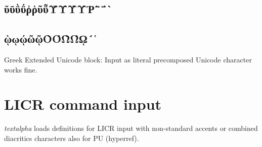 \documentclass{article}
\begin{document}
\subsection{ῠῡῢΰῤῥῦῧῨῩῪΎῬ῭΅`}
\subsection{ῲῳῴῶῷῸΌῺΏῼ´῾}

Greek Extended Unicode block: Input as literal precomposed Unicode character
works fine.

\section{LICR command input}

\newcommand*{\GreekAndCopticI}{\greekscript
  \textdexiakeraia
  \textaristerikeraia
  { }\ypogegrammeni
  \texterotimatiko
  \acctonos{ }
  \"'{ }
  \'\textAlpha
  \textanoteleia
  \'\textEpsilon
  \'\textEta
  \'\textIota
  \'\textOmicron
  \'\textUpsilon
  \'\textOmega
  \'"\textiota
  \textAlpha
  \textBeta
  \textGamma
  \textDelta
  \textEpsilon
  \textZeta
  \textEta
  \textTheta
  \textIota
  \textKappa
  \textLambda
  \textMu
  \textNu
}
\newcommand*{\GreekAndCopticII}{\greekscript
  \textXi
  \textOmicron
  \textPi
  \textRho
  \textSigma
  \textTau
  \textUpsilon
  \textPhi
  \textChi
  \textPsi
  \textOmega
  \"\textIota
  \"\textUpsilon
}
\newcommand*{\GreekAndCopticIII}{\greekscript
  \'\textalpha
  \'\textepsilon
  \'\texteta
  \'\textiota
  \"'\textupsilon
  \textalpha
  \textbeta
  \textgamma
  \textdelta
  \textepsilon
  \textzeta
  \texteta
  \texttheta
  \textiota
  \textkappa
  \textlambda
  \textmu
  \textnu}
\newcommand*{\GreekAndCopticIV}{\greekscript
  \textxi
  \textomicron
  \textpi
  \textrho
  \textfinalsigma
  \textsigma
  \texttau
  \textupsilon
  \textphi
  \textchi
  \textpsi
  \textomega
  \"\textiota
  \"\textupsilon
  \'\textomicron
  \'\textupsilon
  \'\textomega
  \textbetasymbol
  \textthetasymbol
  \textphisymbol
  \textpisymbol
  \textQoppa
  \textqoppa
  \textStigma
  \textstigma
  \textDigamma
  \textdigamma
  \textKoppa
  \textkoppa
  \textSampi
  \textsampi
}

\emph{textalpha} loads definitions for LICR input with non-standard
accents or combined diacritics characters also for PU (hyperref).
\end{document}

